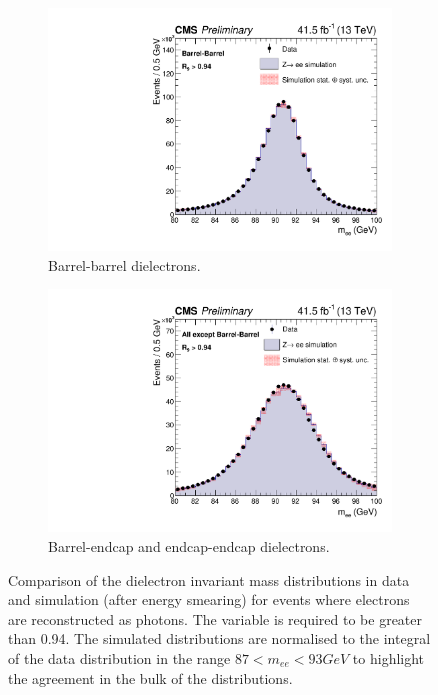 \begin{figure}[h!]
  \centering
  \begin{subfigure}{0.49\textwidth}
    \includegraphics[width=\textwidth]{Figures/Objects/meeBarrel_2017}
    \caption{Barrel-barrel dielectrons.}
    \label{fig:obj_meeBarrel_2017}
  \end{subfigure}
  \begin{subfigure}{0.49\textwidth}
    \includegraphics[width=\textwidth]{Figures/Objects/meeEndcap_2017}
    \caption{Barrel-endcap and endcap-endcap dielectrons.}
    \label{fig:obj_meeEndcap_2017}
  \end{subfigure}
  \caption{Comparison of the dielectron invariant mass distributions in data and simulation
  (after energy smearing) for \Zee
  events where electrons are reconstructed as photons.
  The \RNINE variable is required to be greater than 0.94.
  The simulated distributions are
  normalised to the integral of the data distribution in the range $87 < m_{ee} < 93 GeV$ to highlight
  the agreement in the bulk of the distributions.}
  \label{fig:obj_mee_2017}
\end{figure}

